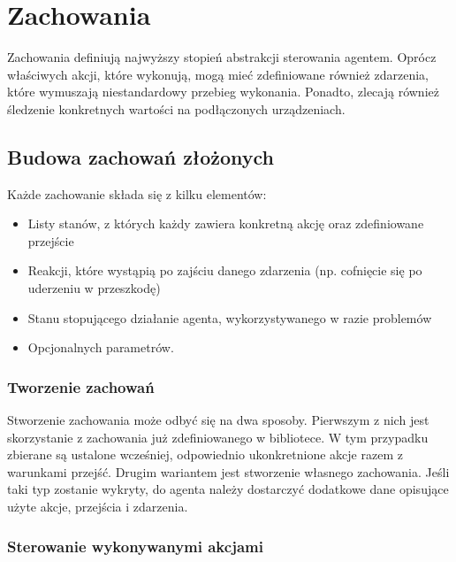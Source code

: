 \chapter{Zachowania}
\label{ch:zachowania}

Zachowania definiują najwyższy stopień abstrakcji sterowania agentem. Oprócz właściwych akcji, które wykonują, mogą mieć zdefiniowane również zdarzenia, które wymuszają niestandardowy przebieg wykonania. Ponadto, zlecają również śledzenie konkretnych wartości na podłączonych urządzeniach.

\section{Budowa zachowań złożonych}

Każde zachowanie składa się z kilku elementów:
\begin{itemize}
    \item Listy stanów, z których każdy zawiera konkretną akcję oraz zdefiniowane przejście
    \item Reakcji, które wystąpią po zajściu danego zdarzenia (np. cofnięcie się po\,uderzeniu w przeszkodę)
    \item Stanu stopującego działanie agenta, wykorzystywanego w razie problemów
    \item Opcjonalnych parametrów.
\end{itemize}

\subsection{Tworzenie zachowań}

Stworzenie zachowania może odbyć się na dwa sposoby. Pierwszym z nich jest skorzystanie z zachowania już zdefiniowanego w bibliotece. W tym przypadku zbierane są ustalone wcześniej, odpowiednio ukonkretnione akcje razem z warunkami przejść. Drugim wariantem jest stworzenie własnego zachowania. Jeśli taki typ zostanie wykryty, do agenta należy dostarczyć dodatkowe dane opisujące użyte akcje, przejścia i zdarzenia.

\subsection{Sterowanie wykonywanymi akcjami}

